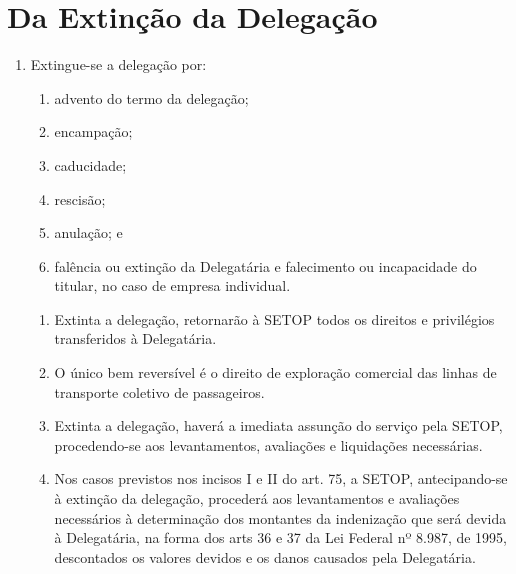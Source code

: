 \section{Da Extinção da Delegação}

\begin{enumerate}[resume, label=Art. \arabic*]

\item Extingue-se a delegação por:

\begin{enumerate}[label=\roman*.]

\item advento do termo da delegação;

\item encampação;

\item caducidade;

\item rescisão;

\item anulação; e

\item falência ou extinção da Delegatária e falecimento ou incapacidade do titular, no caso de empresa individual.

\end{enumerate}

\begin{enumerate}[label= \S \arabic*] %

\item Extinta a delegação, retornarão à SETOP todos os direitos e privilégios transferidos à Delegatária.

\item O único bem reversível é o direito de exploração comercial das linhas de transporte coletivo de passageiros.

\item Extinta a delegação, haverá a imediata assunção do serviço pela SETOP, procedendo-se aos levantamentos, avaliações e liquidações necessárias.

\item Nos casos previstos nos incisos I e II do art. 75, a SETOP, antecipando-se à extinção da delegação, procederá aos levantamentos e avaliações necessários à determinação dos montantes da indenização que será devida à Delegatária, na forma dos arts 36 e 37 da Lei Federal nº 8.987, de 1995, descontados os valores devidos e os danos causados pela Delegatária.

\end{enumerate}


\end{enumerate}
